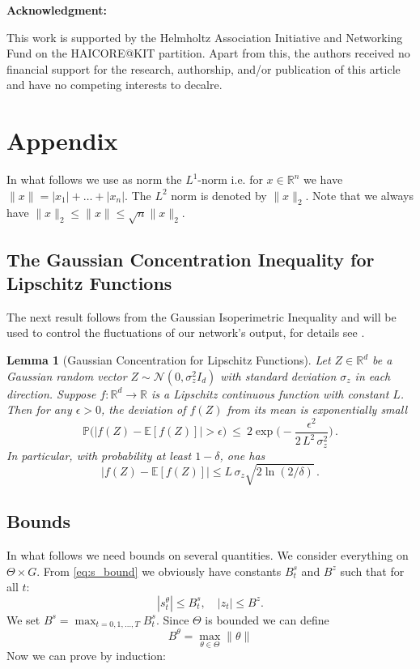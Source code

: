 \documentclass[reqno, 11pt]{amsart}%
\newcommand\PP{\mathbb P}
\newcommand\RR{\mathbb R}
\newtheorem{lemma}[theorem]{Lemma}
\theoremstyle{definition}
\begin{document}
\vspace*{1cm}
\noindent
{\bf  Acknowledgment:}

{This work is supported by the Helmholtz Association Initiative and Networking Fund on the HAICORE@KIT partition. 
Apart from this, the authors received no financial support for the research, authorship, and/or publication of this article and have no competing interests to decalre.}
 

\section{Appendix}
In what follows we use as norm the $L^1$-norm i.e. for $x\in\RR^n$ we have $\|x\|=|x_1|+\ldots +|x_n|.$ The $L^2$ norm is denoted by $\|x\|_2$. Note that we always  have $\|x\|_2 \le \|x\|\le \sqrt{n}\|x\|_2. $
\subsection{The Gaussian Concentration Inequality for Lipschitz Functions}\label{sec:concentration}
 The next result follows from the Gaussian Isoperimetric Inequality and will be used to control the fluctuations of our network's output, for details see \cite{ledoux1994isoperimetry}.
\begin{lemma}[Gaussian Concentration for Lipschitz Functions] 
\label{lem:gaussian-concentration}
Let $Z\in\mathbb{R}^d$ be a Gaussian random vector $Z\sim \mathcal{N}(0,\sigma_z^2 I_d)$ with standard deviation $\sigma_z$ in each direction. Suppose $f: \mathbb{R}^d \to \mathbb{R}$ is a Lipschitz continuous  function with constant $L$. Then for any $\epsilon > 0$, the deviation of $f(Z)$ from its mean is exponentially small
\[
\PP\Big(|f(Z) - \mathbb{E}[f(Z)]| > \epsilon\Big) ~\le~ 2 \exp\!\Big(-\frac{\epsilon^2}{2\,L^2\,\sigma_z^2}\Big)\,. 
\] 
In particular, with probability at least $1-\delta$, one has 
\[
|f(Z)-\mathbb{E}[f(Z)]| \le L\,\sigma_z \sqrt{2\ln(2/\delta)}\,.
\] 
\end{lemma}

\subsection{Bounds}\label{sec:bounds}
In what follows we need bounds on several quantities. We consider everything on $\Theta\times G.$
From \eqref{eq:s_bound}  we obviously have constants $B^s_t$ and $B^z$ such that for all $t:$
\begin{equation}
    |s_t^\theta| \le B^s_t,\quad  |z_t| \le B^z.
\end{equation}
We set  $B^s = \max_{t=0,1,\ldots,T} B_t^s.$
Since $\Theta$ is bounded we can define 
\begin{equation}
    B^\theta = \max_{\theta\in\Theta} \|\theta\|
\end{equation}
Now we can prove by induction:
\end{document}

